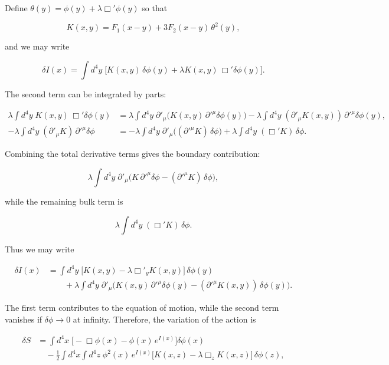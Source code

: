 \documentclass[12pt]{article}
\begin{document}
Define $\theta(y) = \phi(y) + \lambda \Box' \phi(y)$ so that

\[
K(x,y) = F_1(x-y) + 3 F_2(x-y) \, \theta^2(y),
\]

and we may write

\[
\delta I(x) = \int d^4y \; \Big[ K(x,y) \, \delta\phi(y) + \lambda K(x,y) \, \Box' \delta\phi(y) \Big].
\]

The second term can be integrated by parts:

\begin{align*}
\lambda \int d^4y \; K(x,y) \, \Box' \delta\phi(y) &= \lambda \int d^4y \; \partial'_\mu \big( K(x,y) \, \partial'^\mu \delta\phi(y) \big) 
- \lambda \int d^4y \; (\partial'_\mu K(x,y)) \, \partial'^\mu \delta\phi(y), \\
- \lambda \int d^4y \; (\partial'_\mu K) \, \partial'^\mu \delta\phi &= - \lambda \int d^4y \; \partial'_\mu \big( (\partial'^\mu K) \, \delta\phi \big) 
+ \lambda \int d^4y \; (\Box' K) \, \delta\phi.
\end{align*}

Combining the total derivative terms gives the boundary contribution:

\[
\lambda \int d^4y \; \partial'_\mu \Big( K \, \partial'^\mu \delta\phi - (\partial'^\mu K) \, \delta\phi \Big),
\]

while the remaining bulk term is

\[
\lambda \int d^4y \; (\Box' K) \, \delta\phi.
\]

Thus we may write

\begin{align}
\delta I(x) &= \int d^4y \; \big[ K(x,y) - \lambda \Box'_y K(x,y) \big] \, \delta\phi(y) \nonumber \\
&\qquad + \lambda \int d^4y \; \partial'_\mu \Big( K(x,y) \, \partial'^\mu \delta\phi(y) - (\partial'^\mu K(x,y)) \, \delta\phi(y) \Big).
\end{align}

The first term contributes to the equation of motion, while the second term vanishes if $\delta\phi \to 0$ at infinity. Therefore, the variation of the action is

\begin{align}
\delta S &= \int d^4x \; \Big[ - \Box \phi(x) - \phi(x) \, e^{I(x)} \Big] \delta\phi(x) \nonumber\\
&\quad - \frac{1}{2} \int d^4x \int d^4z \; \phi^2(x) \, e^{I(x)} \big[ K(x,z) - \lambda \Box_z K(x,z) \big] \, \delta\phi(z),
\end{align}
\end{document}
